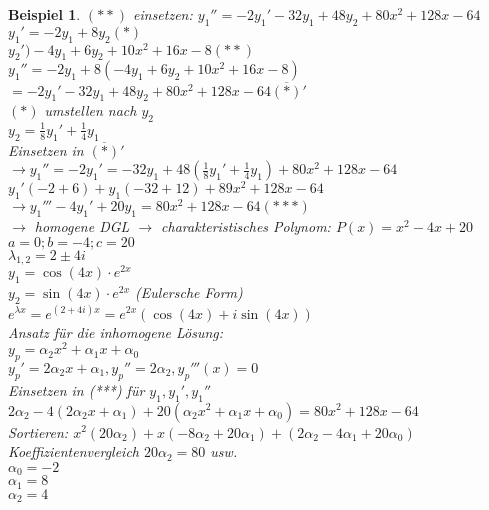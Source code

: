\documentclass[fontset=ubuntu,12pt,a4paper]{scrreprt}
\newtheorem{beispiel}[defi]{Beispiel}
\begin{document}
\begin{beispiel}
         \((**)\) einsetzen: \({y_1}'' = -2{y_1}'-32y_1+48y_2+80x^2+128x-64\) \\
         \( y_1'=-2y_1+8y_2 (*) \) \\
         \(y_2')-4y_1+6y_2+10x^2+16x-8 (**) \) \\
         \( y_1''=-2y_1+8(-4y_1+6y_2+10x^2+16x-8) \) \\
         \( =-2y_1'-32y_1+48y_2+80x^2+128x-64  \overline{(*)}' \) \\
         \( (*) \) umstellen nach \( y_2 \) \\ 
         \( y_2=\frac{1}{8}y_1'+\frac{1}{4}y_1 \) \\
         Einsetzen in \( \overline{(*)}' \) \\
         \( \rightarrow y_1''=-2y_1'=-32y_1+48(\frac{1}{8}y_1'+\frac{1}{4}y_1) + 80x^2+128x-64 \) \\
         \(y_1'(-2+6)+y_1(-32+12)+89x^2+128x-64 \) \\
         \(\rightarrow y_1'''-4y_1'+20y_1=80x^2+128x-64 (***) \) \\
         \(\rightarrow \) homogene DGL \(\rightarrow \) charakteristisches Polynom: \(P(x)=x^2-4x+20 \) \\
         \(a=0; b=-4;c=20\) \\
         \(\lambda_{1,2}=2\pm4i \) \\
         \(y_1=\cos(4x)\cdot e^{2x} \) \\
         \(y_2=\sin(4x)\cdot e^{2x} \) (Eulersche Form)\\
         \(e^{\lambda x}=e^{(2+4i)x}=e^{2x}(\cos(4x)+i\sin(4x)) \) \\
         Ansatz für die inhomogene Lösung: \\
         \(y_p=\alpha_2x^2+\alpha_1x+\alpha_0 \) \\
         \(y_p'=2\alpha_2x+\alpha_1, y_p''=2\alpha_2, y_p'''(x)=0 \) \\
         Einsetzen in (***) für \(y_1, y_1', y_1''\) \\
         \( 2\alpha_2-4(2\alpha_2x+\alpha_1)+20(\alpha_2x^2+\alpha_1x+\alpha_0) = 80x^2+128x-64 \) \\
         Sortieren: \(x^2(20\alpha_2)+x(-8\alpha_2+20\alpha_1)+(2\alpha_2-4\alpha_1+20\alpha_0)\)
         \\ Koeffizientenvergleich \(20\alpha_2 = 80 \) usw. \\
         \(\alpha_0=-2 \)\\
         \(\alpha_1=8 \)\\
         \(\alpha_2=4 \)\\

\end{beispiel}
\end{document}
